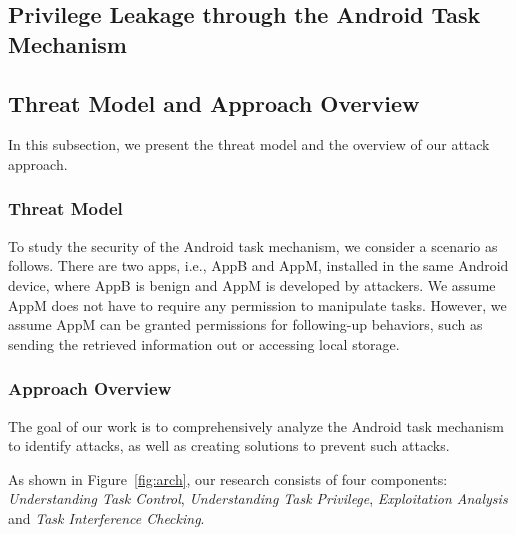\documentclass[letterpaper,12pt]{article}
\begin{document}
   \newpage
   \begin{singlespace}
   \section{Privilege Leakage through the Android Task Mechanism}
   \end{singlespace}
    \label{sec:atmtitle}




\subsection{Threat Model and Approach Overview} \label{sec:threatandapproach}

In this subsection, we present the threat model and the overview of our attack approach.

\subsubsection{Threat Model} \label{subsec:threat}

To study the security of the Android task mechanism, we consider a
scenario as follows. There are two apps, i.e., AppB and AppM,
installed in the same Android device, where AppB is benign and AppM is
developed by attackers.  We assume AppM does not have to require any
permission to manipulate tasks. However, we assume AppM can be granted
permissions for following-up behaviors, such as sending the retrieved
information out or accessing local storage.

\subsubsection{Approach Overview} \label{sec:approachoverview}

The goal of our work is to comprehensively analyze the Android task
mechanism to identify attacks, as well as creating solutions to
prevent such attacks.

As shown in Figure~\ref{fig:arch}, our research consists of four
components: \textsl{Understanding Task Control}, \textsl{Understanding
  Task Privilege}, \textsl{Exploitation Analysis} and \textsl{Task
  Interference Checking}.
\end{document}

